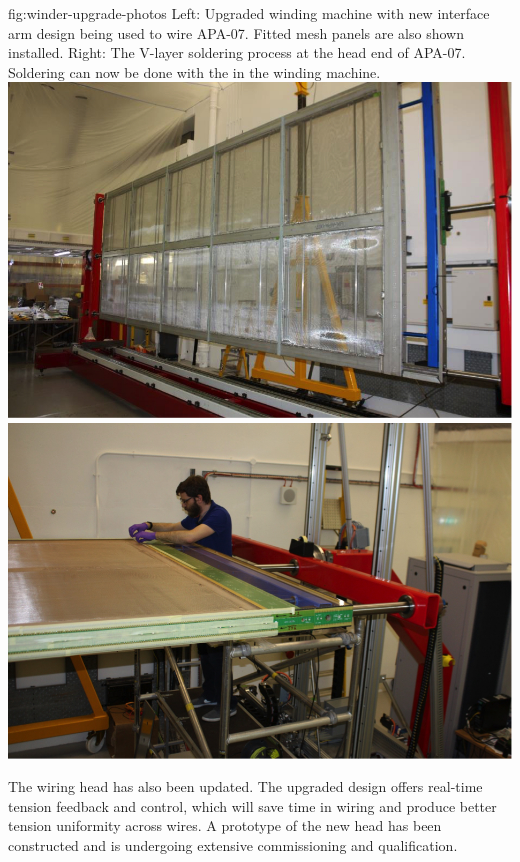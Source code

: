 \begin{dunefigure}{fig:winder-upgrade-photos}
{Left: Upgraded winding machine with new interface arm design being used to wire APA-07. Fitted mesh panels are also shown installed. Right: The V-layer soldering process at the head end of APA-07. Soldering can now be done with the  in the winding machine.}
\includegraphics[height=0.25\textheight,trim=10mm 0mm 0mm 0mm,clip]{graphics/sp-apa-updated-winder.jpg} 
\includegraphics[height=0.25\textheight,trim=0mm 0mm 10mm 0mm,clip]{graphics/sp-apa-updated-winder-soldering.jpg}
\end{dunefigure}

The wiring head has also been updated. The upgraded design offers real-time tension feedback and control, which will save time in wiring and produce better tension uniformity across wires.  A prototype of the new head has been constructed and is undergoing extensive commissioning and qualification.   

